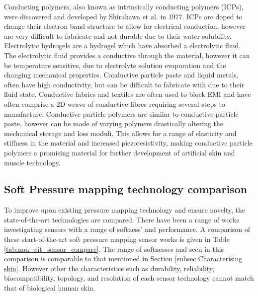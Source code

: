 Conducting polymers, also known as intrinsically conducting polymers (ICPs), were discovered and developed by Shirakawa et al. \cite{Shirakawa1977} in 1977. ICPs are doped to change their electron band structure to allow for electrical conduction, however are very difficult to fabricate and not durable due to their water solubility. Electrolytic hydrogels are a hydrogel which have absorbed a electrolytic fluid. The electrolytic fluid provides a conductive through the material, however it can be temperature sensitive, due to electrolyte solution evaporation and the changing mechanical properties. Conductive particle paste and liquid metals, often have high conductivity, but can be difficult to fabricate with due to their fluid state. Conductive fabrics and textiles are often used to block EMI and have often comprise a  2D weave of conductive fibres requiring several steps to manufacture. Conductive particle polymers are similar to conductive particle paste, however can be made of varying polymers drastically altering the mechanical storage and loss moduli. This allows for a range of elasticity and stiffness in the material and increased piezoresistivity, making conductive particle polymers a promising material for further development of artificial skin and muscle technology. 


\subsection{Soft Pressure mapping technology comparison}
To improve upon existing pressure mapping technology and ensure novelty, the state-of-the-art technologies are compared. There have been a range of works investigating sensors with a range of softness' and performance. A comparison of these start-of-the-art soft pressure mapping sensor works is given in Table \ref{tab:non_eit_sensor_compare}.  The range of softnesses and seen in this comparison is comparable to that mentioned in Section \ref{subsec:Characterising skin}. However other the characteristics such as durability, reliability, biocompatibility, topology, and resolution of each sensor technology cannot match that of biological human skin.

